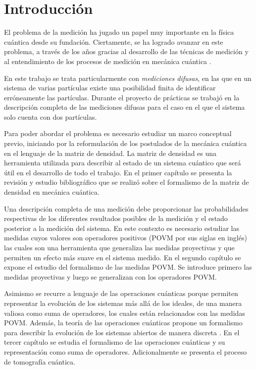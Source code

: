 \chapter*{Introducción}

El problema de la medición ha jugado un papel muy importante en la física
cuántica desde su fundación. Ciertamente, se ha logrado avanzar en este
problema, a través de los años gracias al desarrollo de las técnicas de
medición y al entendimiento de los procesos de medición en mecánica cuántica
{\cite{Pineda_2021}}. 

En este trabajo se trata particularmente con \textit{mediciones difusas}, en las
que en un sistema de varias partículas existe una posibilidad finita de
identificar erróneamente las partículas. Durante el proyecto de prácticas se
trabajó en la descripción completa de las mediciones difusas para el caso en el
que el sistema solo cuenta con dos partículas.

Para poder abordar el problema es necesario estudiar un marco conceptual previo, iniciando por la reformulación de los postulados de la mecánica cuántica en el lenguaje de la matriz de densidad. La matriz de densidad es una herramienta utilizada para describir al estado de un sistema cuántico que será útil en el desarrollo de todo el trabajo. En el primer capítulo  se presenta la revisión y estudio bibliográfico que se realizó sobre el formalismo de la matriz de densidad en mecánica cuántica. 

Una descripción completa de una medición debe proporcionar las probabilidades
respectivas de los diferentes resultados posibles de la medición y el estado
posterior a la medición del sistema. 
En este contexto es necesario estudiar las medidas cuyos valores son operadores
positivos (POVM por sus siglas en inglés) las cuales son una herramienta que
generaliza las medidas proyectivas y que permiten un efecto más suave en el
sistema medido. En el segundo capítulo se expone el estudio del formalismo de
las medidas POVM\@. Se introduce primero las medidas proyectivas y luego se
generalizan con los operadores POVM\@. 

Asimismo se recurre a lenguaje de las operaciones cuánticas porque permiten
representar la evolución de los sistemas más allá de los ideales, de una manera
valiosa como suma de operadores, los cuales están relacionados con las medidas
POVM\@. Además, la teoría de las operaciones cuánticas propone un formalismo
para describir la evolución de los sistemas abiertos de manera discreta
{\cite{nielsen_chuang_2010}}. En el tercer capítulo se estudia el formalismo de
las operaciones cuánticas y su representación como suma de operadores.
Adicionalmente se presenta el proceso de tomografía cuántica. 



